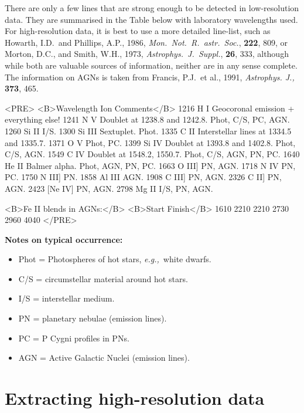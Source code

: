 \begin{htmlonly}
There are only a few lines that are strong enough to be detected in
low-resolution data.  They are summarised in the Table below with laboratory
wavelengths used.  For high-resolution data, it is best to use a more detailed
line-list, such as Howarth, I.D.\ and Phillips, A.P., 1986,
{\it Mon.\ Not.\ R.\ astr.\ Soc.},
{\bf 222}, 809, or Morton, D.C., and Smith, W.H., 1973, {\it
Astrophys.\ J.\ Suppl.}, {\bf 26}, 333, although while both are valuable
sources of information, neither are in any sense complete.  The information on
AGNs is taken from Francis, P.J.~et al., 1991, {\it Astrophys. J.,} {\bf 373},
465.

\begin{rawhtml}
<PRE>
<B>Wavelength  Ion      Comments</B>
   1216     H I      Geocoronal emission + everything else!
   1241     N V      Doublet at 1238.8 and 1242.8. Phot, C/S, PC, AGN.
   1260     Si II    I/S.
   1300     Si III   Sextuplet. Phot.
   1335     C II     Interstellar lines at 1334.5 and 1335.7.
   1371     O V      Phot, PC.
   1399     Si IV    Doublet at 1393.8 and 1402.8. Phot, C/S, AGN.
   1549     C IV     Doublet at 1548.2, 1550.7. Phot, C/S, AGN, PN, PC.
   1640     He II    Balmer alpha. Phot, AGN, PN, PC.
   1663     O III]   PN, AGN.
   1718     N IV     PN, PC.
   1750     N III]   PN.
   1858     Al III   AGN.
   1908     C III]   PN, AGN.
   2326     C II]    PN, AGN.
   2423     [Ne IV]  PN, AGN.
   2798     Mg II    I/S, PN, AGN.

<B>Fe II blends in AGNs:</B>
  <B>Start   Finish</B>
   1610    2210
   2210    2730
   2960    4040
</PRE>
\end{rawhtml}
\end{htmlonly}

{\bf Notes on typical occurrence:}

\begin{itemize}
\item Phot =  Photospheres of hot stars, {\it{e.g.,}}\ white dwarfs.
\item C/S = circumstellar material around hot stars.
\item I/S = interstellar medium.
\item PN = planetary nebulae (emission lines).
\item PC = P Cygni profiles in PNs.
\item AGN = Active Galactic Nuclei (emission lines).
\end{itemize}

\section{Extracting high-resolution data}

